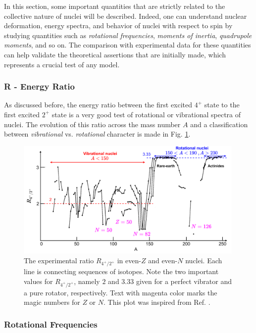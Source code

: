 In this section, some important quantities that are strictly related to the collective nature of nuclei will be described. Indeed, one can understand nuclear deformation, energy spectra, and behavior of nuclei with respect to spin by studying quantities such as \emph{rotational frequencies}, \emph{moments of inertia}, \emph{quadrupole moments}, and so on. The comparison with experimental data for these quantities can help validate the theoretical assertions that are initially made, which represents a crucial test of any model.

\subsubsection{R - Energy Ratio}

As discussed before, the energy ratio between the first excited $4^+$ state to the first excited $2^+$ state is a very good test of rotational or vibrational spectra of nuclei. The evolution of this ratio across the mass number $A$ and a classification between \emph{vibrational} vs. \emph{rotational} character is made in Fig. \ref{4state-2state-ratio}.
\begin{figure}
    \centering
    \includegraphics[width=0.99\textwidth]{Chapters/Figures/vibrations_rotations_E42-ratio.pdf}
    \caption{The experimental ratio $R_{4^+/2^+}$ in even-$Z$ and even-$N$ nuclei. Each line is connecting sequences of isotopes. Note the two important values for $R_{4^+/2^+}$, namely $2$ and $3.33$ given for a perfect vibrator and a pure rotator, respectively. Text with magenta color marks the magic numbers for $Z$ or $N$. This plot was inspired from Ref. \cite{casten2000nuclear}.}
    \label{4state-2state-ratio}
\end{figure}

\subsubsection{Rotational Frequencies}

